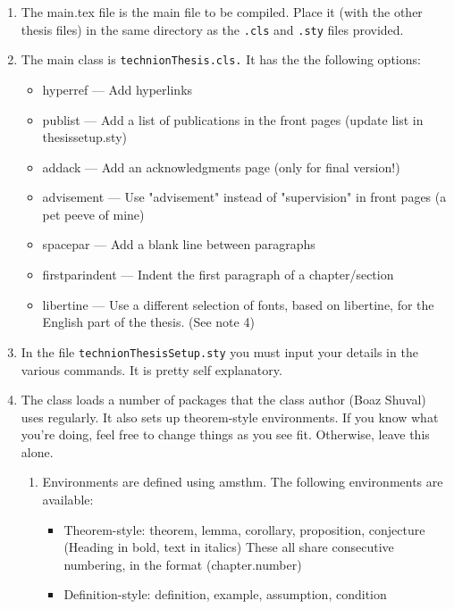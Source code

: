\begin{enumerate}
\item The main.tex file is the main file to be compiled. Place it (with the other thesis files) in the same directory as the \verb".cls" and \verb".sty"
    files provided.                                                                                                                                          
    \item  The main class is \verb"technionThesis.cls."
   It has the the following options:  
   \begin{itemize}
       \item  hyperref       ---  Add hyperlinks
       \item  publist        ---  Add a list of publications in the front pages (update list in thesissetup.sty)
       \item  addack         ---  Add an acknowledgments page (only for final version!)
       \item  advisement     ---  Use "advisement" instead of "supervision" in front pages (a pet peeve of mine)
       \item  spacepar       ---  Add a blank line between paragraphs
       \item  firstparindent ---  Indent the first paragraph of a chapter/section
       \item  libertine      ---  Use a different selection of fonts, based on libertine, for the English part of the thesis. (See note 4)
    \end{itemize}
\item In the file \verb"technionThesisSetup.sty" you must input your details in the various commands. It is pretty self explanatory. 
\item The class loads a number of packages that the class author (Boaz Shuval) uses regularly. It also sets up theorem-style environments.
   If you know what you're doing, feel free to change things as you see fit. Otherwise, leave this alone. 
   \begin{enumerate}
       \item Environments are defined using amsthm. The following environments are available:
           \begin{itemize}
               \item Theorem-style: theorem, lemma, corollary, proposition, conjecture
      (Heading in bold, text in italics)
      These all share consecutive numbering, in the format (chapter.number)
  \item Definition-style: definition, example, assumption, condition 

\end{itemize}
\end{enumerate}
\end{enumerate}
